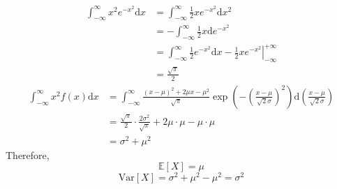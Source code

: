 \documentclass[a4paper, 12pt, answers]{exam} %
\begin{document}
\begin{questions}
\begin{solution}
\begin{parts}
    	\begin{equation*}
    	\begin{aligned}
    	\int_{-\infty}^{\infty}x^2 e^{-x^2}\mathrm{d}x&=	\int_{-\infty}^{\infty}\frac 12 x e^{-x^2}\mathrm{d}x^2\\
    	&=-\int_{-\infty}^{\infty}\frac 12 x\mathrm{d}e^{-x^2}\\
    	&=\int_{-\infty}^{\infty}\frac 12 e^{-x^2}\mathrm{d}x- \left.\frac 12 xe^{-x^2} \right|_{-\infty}^{+\infty}\\
    	&=\frac{\sqrt{\pi}}{2}
    	\end{aligned}
    	\end{equation*}
    	\begin{equation*}
    	\begin{aligned}
    	\int_{-\infty}^{\infty}x^2f(x)\mathrm{d}x&=\int_{-\infty}^{\infty}\frac{(x-\mu)^2+2\mu x -\mu^2}{\sqrt{\pi}}\exp\left(-\left(\frac{x-\mu}{\sqrt{2}\sigma}\right)^2\right)\mathrm{d}\left(\frac{x-\mu}{\sqrt{2}\sigma}\right)\\
    	&=\frac{\sqrt{\pi}}{2} \cdot \frac{2\sigma^2}{\sqrt{\pi}}+2\mu\cdot\mu-\mu\cdot\mu\\
    	&=\sigma^2+\mu^2
    	\end{aligned}
    	\end{equation*}
    	Therefore,
    	\begin{equation*}
    	\mathbb{E}\left[X\right]=\mu
    	\end{equation*}
	    \begin{equation*}
        \mathrm{Var}\left[X\right]=\sigma^2+\mu^2-\mu^2=\sigma^2
        \end{equation*}
    	\end{parts}
	\end{solution}






\end{questions}	
\end{document}
